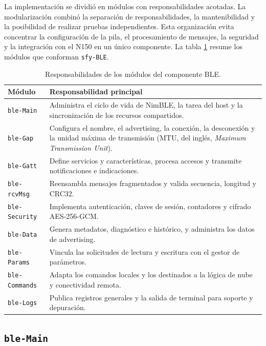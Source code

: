 La implementación se dividió en módulos con responsabilidades acotadas. La modularización combinó la separación de responsabilidades, la mantenibilidad y la posibilidad de realizar pruebas independientes. Esta organización evita concentrar la configuración de la pila, el procesamiento de mensajes, la seguridad y la integración con el N150 en un único componente. La tabla \ref{tab:modulos_ble} resume los módulos que conforman \texttt{sfy-BLE}.

\begin{table}[htbp]
\centering
\caption{Responsabilidades de los módulos del componente BLE.}
\label{tab:modulos_ble}
\begin{tabular}{p{} p{}}
\toprule
\textbf{Módulo} & \textbf{Responsabilidad principal} \\
\midrule
\texttt{ble-Main} & Administra el ciclo de vida de NimBLE, la tarea del host y la sincronización de los recursos compartidos. \\
\texttt{ble-Gap} & Configura el nombre, el advertising, la conexión, la desconexión y la unidad máxima de transmisión (MTU, del inglés, \textit{Maximum Transmission Unit}). \\
\texttt{ble-Gatt} & Define servicios y características, procesa accesos y transmite notificaciones e indicaciones. \\
\texttt{ble-rcvMsg} & Reensambla mensajes fragmentados y valida secuencia, longitud y CRC32. \\
\texttt{ble-Security} & Implementa autenticación, claves de sesión, contadores y cifrado AES-256-GCM. \\
\texttt{ble-Data} & Genera metadatos, diagnóstico e histórico, y administra los datos de advertising. \\
\texttt{ble-Params} & Vincula las solicitudes de lectura y escritura con el gestor de parámetros. \\
\texttt{ble-Commands} & Adapta los comandos locales y los destinados a la lógica de nube y conectividad remota. \\
\texttt{ble-Logs} & Publica registros generales y la salida de terminal para soporte y depuración. \\
\bottomrule
\end{tabular}
\end{table}

\subsection{\texttt{ble-Main}}


